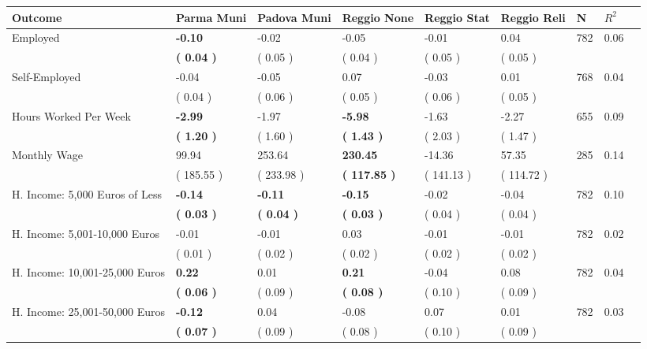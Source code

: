 \begin{tabular}{L{6.2cm} C{1.8cm} C{1.8cm} C{1.8cm} C{1.8cm} C{1.8cm} C{1.8cm} C{0.3cm} C{0.3cm}}
\toprule
 \textbf{Outcome} & \textbf{Parma Muni} & \textbf{Padova Muni} & \textbf{Reggio None} & \textbf{Reggio Stat} & \textbf{Reggio Reli} & \textbf{N} & \textbf{$ R^2$} \\
\midrule
Employed & \textbf{    -0.10} &     -0.02 &     -0.05 &     -0.01 &      0.04  & 782 &       0.06 \\ 
 & \textbf{(     0.04 )} & (     0.05 ) & (     0.04 ) & (     0.05 ) & (     0.05 )  & \\
Self-Employed &     -0.04 &     -0.05 &      0.07 &     -0.03 &      0.01  & 768 &       0.04 \\ 
 & (     0.04 ) & (     0.06 ) & (     0.05 ) & (     0.06 ) & (     0.05 )  & \\
Hours Worked Per Week & \textbf{    -2.99} &     -1.97 & \textbf{    -5.98} &     -1.63 &     -2.27  & 655 &       0.09 \\ 
 & \textbf{(     1.20 )} & (     1.60 ) & \textbf{(     1.43 )} & (     2.03 ) & (     1.47 )  & \\
Monthly Wage &     99.94 &    253.64 & \textbf{   230.45} &    -14.36 &     57.35  & 285 &       0.14 \\ 
 & (   185.55 ) & (   233.98 ) & \textbf{(   117.85 )} & (   141.13 ) & (   114.72 )  & \\
H. Income: 5,000 Euros of Less & \textbf{    -0.14} & \textbf{    -0.11} & \textbf{    -0.15} &     -0.02 &     -0.04  & 782 &       0.10 \\ 
 & \textbf{(     0.03 )} & \textbf{(     0.04 )} & \textbf{(     0.03 )} & (     0.04 ) & (     0.04 )  & \\
H. Income: 5,001-10,000 Euros &     -0.01 &     -0.01 &      0.03 &     -0.01 &     -0.01  & 782 &       0.02 \\ 
 & (     0.01 ) & (     0.02 ) & (     0.02 ) & (     0.02 ) & (     0.02 )  & \\
H. Income: 10,001-25,000 Euros & \textbf{     0.22} &      0.01 & \textbf{     0.21} &     -0.04 &      0.08  & 782 &       0.04 \\ 
 & \textbf{(     0.06 )} & (     0.09 ) & \textbf{(     0.08 )} & (     0.10 ) & (     0.09 )  & \\
H. Income: 25,001-50,000 Euros & \textbf{    -0.12} &      0.04 &     -0.08 &      0.07 &      0.01  & 782 &       0.03 \\ 
 & \textbf{(     0.07 )} & (     0.09 ) & (     0.08 ) & (     0.10 ) & (     0.09 )  & \\

\end{tabular}
